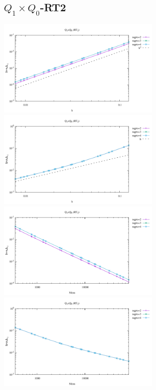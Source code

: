 \subsection*{$Q_1\times Q_0$-RT2}
\begin{center}
\includegraphics[width=8cm]{python_codes/fieldstone_120/results/RT2Q0-velocity-h.pdf}
\includegraphics[width=8cm]{python_codes/fieldstone_120/results/RT2Q0-pressure-h.pdf}
\includegraphics[width=8cm]{python_codes/fieldstone_120/results/RT2Q0-velocity-Nfem.pdf}
\includegraphics[width=8cm]{python_codes/fieldstone_120/results/RT2Q0-pressure-Nfem.pdf}
\end{center}

